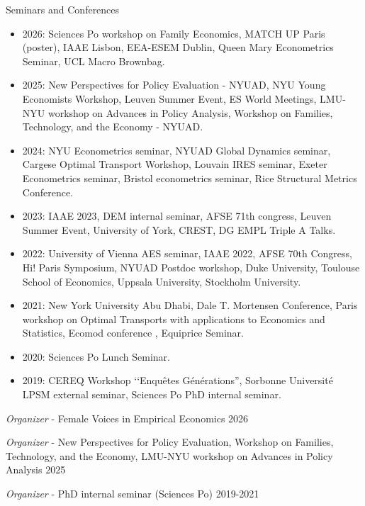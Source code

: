 \documentclass{resume} %
\begin{document}

\begin{rSection}{Seminars and Conferences}
\begin{itemize}
  \item 2026: Sciences Po workshop on Family Economics, MATCH UP Paris (poster), IAAE Lisbon, EEA-ESEM Dublin, Queen Mary Econometrics Seminar, UCL Macro Brownbag.
  \item 2025: New Perspectives for Policy Evaluation - NYUAD, NYU Young Economists Workshop, Leuven Summer Event, ES World Meetings, LMU-NYU workshop on Advances in Policy Analysis, Workshop on Families, Technology, and the Economy - NYUAD.
  \item 2024: NYU Econometrics seminar, NYUAD Global Dynamics seminar, Cargese Optimal Transport Workshop, Louvain IRES seminar, Exeter Econometrics seminar, Bristol econometrics seminar, Rice Structural Metrics Conference.  
  \item 2023: IAAE 2023, DEM internal seminar, AFSE 71th congress, Leuven Summer Event, University of York, CREST, DG EMPL Triple A Talks.
  \item 2022: University of Vienna AES seminar, IAAE 2022, AFSE 70th Congress, Hi! Paris Symposium, NYUAD Postdoc workshop, Duke University, Toulouse School of Economics, Uppsala University, Stockholm University.
  \item 2021: New York University Abu Dhabi, Dale T. Mortensen Conference, Paris workshop on Optimal Transports with applications to Economics and Statistics, Ecomod conference , Equiprice Seminar.
  \item 2020: Sciences Po Lunch Seminar.
  \item 2019: CEREQ Workshop ‘‘Enquêtes Générations'', Sorbonne Université LPSM external seminar, Sciences Po PhD internal seminar.
\end{itemize}

{\em Organizer} - Female Voices in Empirical Economics \hfill {2026}

{\em Organizer} - New Perspectives for Policy Evaluation, Workshop on Families, Technology, and the Economy, LMU-NYU workshop on Advances in Policy Analysis \hfill {2025}

{\em Organizer} - PhD internal seminar (Sciences Po) \hfill {2019-2021}


\end{rSection}
\end{document}
